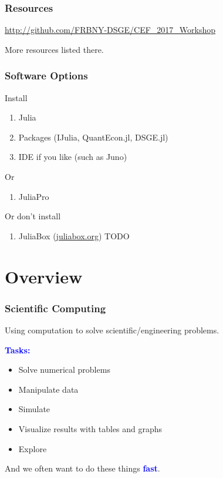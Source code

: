 \documentclass[
  xcolor={svgnames},
  hyperref={colorlinks,citecolor=DeepPink4,linkcolor=DarkRed,urlcolor=DarkBlue}
  ]{beamer}  %
\newcommand\boldblue[1]{\textcolor{blue}{\textbf{#1}}}
\begin{document}
\begin{frame}
  \frametitle{Resources}

  \begin{center}
  \href{http://github.com/FRBNY-DSGE/CEF\_2017\_Workshop}{http://github.com/FRBNY-DSGE/CEF\_2017\_Workshop}
  \end{center}
  \vspace{2em}

  More resources listed there.
\end{frame}


\begin{frame}
  \frametitle{Software Options}

  Install
  \begin{enumerate}
    \item Julia
    \item Packages (IJulia, QuantEcon.jl, DSGE.jl)
    \item IDE if you like (such as Juno)
  \end{enumerate}

  \vspace{1em}
  Or
  \begin{enumerate}
    \item JuliaPro
  \end{enumerate}

  \vspace{1em}
  Or don't install
  \begin{enumerate}
    \item JuliaBox (\href{juliabox.org}{juliabox.org}) TODO
  \end{enumerate}

\end{frame}

\section{Overview}

\begin{frame}
  \frametitle{Scientific Computing}

  Using computation to solve scientific/engineering problems.

  \vspace{1em}
  \boldblue{Tasks:}
  \begin{itemize}
    \item Solve numerical problems
    \item Manipulate data
    \item Simulate
    \item Visualize results with tables and graphs
    \item Explore
  \end{itemize}

  \pause
  \vspace{1em}
  And we often want to do these things \boldblue{fast}.
\end{frame}
\end{document}
